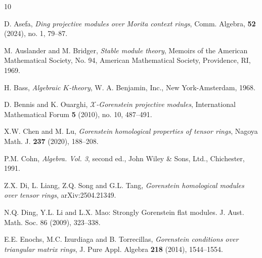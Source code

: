 \documentclass[10pt,twoside]{amsart}
\theoremstyle{bfupright head,slanted body}
\theoremstyle{bfupright head,upright body}
\theoremstyle{fixed bf head,slanted body}
\theoremstyle{fixed bf head,upright body}
\theoremstyle{numbered paragraph}
\numberwithin{equation}{res}
\begin{document}

%
%

\def\cprime{$'$}
  \providecommand{\arxiv}[2][AC]{\mbox{\href{http://arxiv.org/abs/#2}{\sf
  arXiv:#2 [math.#1]}}}
  \providecommand{\oldarxiv}[2][AC]{\mbox{\href{http://arxiv.org/abs/math/#2}{\sf
  arXiv:math/#2
  [math.#1]}}}\providecommand{\MR}[1]{\mbox{\href{http://www.ams.org/mathscinet-getitem?mr=#1}{#1}}}
  \renewcommand{\MR}[1]{\mbox{\href{http://www.ams.org/mathscinet-getitem?mr=#1}{#1}}}
\providecommand{\bysame}{\leavevmode\hbox to3em{\hrulefill}\thinspace}
\providecommand{\MR}{\relax\ifhmode\unskip\space\fi MR }
\providecommand{\MRhref}[2]{%
  \href{http://www.ams.org/mathscinet-getitem?mr=#1}{#2}
}
\providecommand{\href}[2]{#2}
\begin{thebibliography}{10}

D. Asefa, \emph{Ding projective modules over Morita context rings},
Comm. Algebra, {\bf 52} (2024), no. 1, 79--87. 

M. Auslander and M. Bridger, \emph{Stable module theory}, Memoirs of the
  American Mathematical Society, No. 94, American Mathematical Society,
  Providence, RI, 1969. %

H. Bass, \emph{Algebraic {$K$}-theory}, W. A. Benjamin, Inc., New
  York-Amsterdam, 1968. %

D. Bennis and K. Ouarghi,  \emph{$\mathcal{X}$-Gorenstein projective modules}, International Mathematical Forum {\bf 5} (2010), no. 10, 487--491.

X.W. Chen and M. Lu, \emph{Gorenstein homological properties of tensor
  rings}, Nagoya Math. J. \textbf{237} (2020), 188--208. %

P.M. Cohn, \emph{Algebra. {V}ol. 3}, second ed., John Wiley \& Sons, Ltd.,
  Chichester, 1991. %

Z.X. Di, L. Liang, Z.Q. Song and G.L. Tang, \emph{Gorenstein homological modules over tensor rings}, arXiv:2504.21349.

N.Q. Ding, Y.L. Li and L.X. Mao: Strongly Gorenstein flat modules. J. Aust. Math. Soc. 86 (2009), 323–338.

E.E. Enochs, M.C. Izurdiaga and B. Torrecillas, \emph{Gorenstein conditions over triangular matrix rings}, J. Pure Appl. Algebra {\bf 218} (2014), 1544--1554.


\end{thebibliography}
\end{document}
